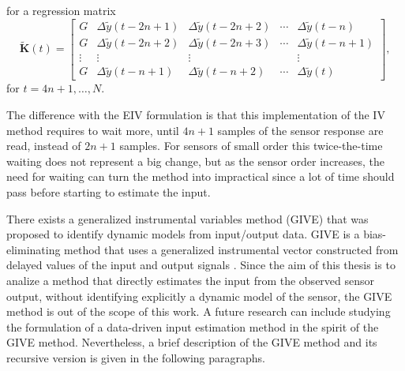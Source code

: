 \documentclass[11pt]{article}
\begin{document}
\begin{itemize}
\begin{itemize}
    for a regression matrix
    \begin{equation} \tag{4.25} \widetilde{\mathbf{K}}(t) = \begin{bmatrix} G & \Delta \widetilde{y}(t-2n+1) & \Delta \widetilde{y}(t-2n+2) & \cdots & \Delta \widetilde{y}(t-n) \\ G & \Delta \widetilde{y}(t-2n+2) & \Delta \widetilde{y}(t-2n+3) & \cdots & \Delta \widetilde{y}(t-n+1) \\ \vdots & \vdots & \vdots & & \vdots \\ G & \Delta \widetilde{y}(t-n+1) & \Delta \widetilde{y}(t-n+2) & \cdots & \Delta \widetilde{y}(t) \end{bmatrix} , \label{eqn:matrixK_t} \end{equation}
    for $t = 4n+1, \ldots, N$.

    The difference with the EIV formulation is that this implementation of the IV method requires to wait more, until $4n+1$ samples of the sensor response are read, instead of $2n+1$ samples. 
    For sensors of small order this twice-the-time waiting does not represent a big change, but as the sensor order increases, the need for waiting can turn the method into impractical since a lot of time should pass before starting to estimate the input. 
    
    There exists a generalized instrumental variables method (GIVE) that was proposed to identify dynamic models from input/output data. 
    GIVE is a bias-eliminating method that uses a generalized instrumental vector constructed from delayed values of the input and output signals \cite{Soderstrom18}.
    Since the aim of this thesis is to analize a method that directly estimates the input from the observed sensor output, without identifying explicitly a dynamic model of the sensor, the GIVE method is out of the scope of this work. 
    A future research can include studying the formulation of a data-driven input estimation method in the spirit of the GIVE method. 
    Nevertheless, a brief description of the GIVE method and its recursive version is given in the following paragraphs.
    

\end{itemize}
\end{itemize}
\end{document}
